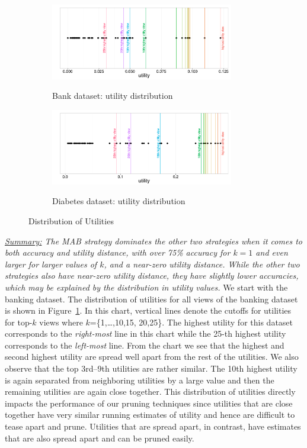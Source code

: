 \begin{figure}[h]
	\centering
	\begin{subfigure}{1\linewidth}
		\centering
		{\includegraphics[width=8cm]
		{Images/bank_utility_distribution.pdf}}
		\caption{Bank dataset: utility distribution}
		\label{fig:bank_utility_distribution}
	\end{subfigure}
	
	\begin{subfigure}{1\linewidth}
		\centering
		{\includegraphics[width=8cm]
		{Images/diabetes_utility_distribution.pdf}}
		\caption{Diabetes dataset: utility distribution}
		\label{fig:diabetes_utility_distribution}
	\end{subfigure}

\vspace{-5pt}
\label{fig:utility_distribution}
\caption{Distribution of Utilities}
\vspace{-10pt}
\end{figure}


{\em \underline{Summary:} The MAB strategy dominates the other two 
strategies when it comes to both accuracy and utility distance,
with over 75\% accuracy for $k = 1$ and even larger for larger
values of $k$, and a near-zero utility distance. 
While the other two strategies also have near-zero utility distance,
they have slightly lower accuracies, which may be explained by the 
distribution in utility values.
 }
We start with the banking dataset.
The distribution of utilities for all views of the banking dataset is
shown in Figure~\ref{fig:bank_utility_distribution}. 
In this chart, vertical lines denote the cutoffs for utilities for top-$k$ views
where $k$=\{1,\ldots,10,15, 20,25\}.
The highest utility for this dataset corresponds to the {\it right-most} line
in this chart while the 25-th highest utility corresponds to the {\it left-most}
line.
From the chart we see that the
highest and second highest utility are spread well apart from the rest of the
utilities.
We also observe that the top 3rd--9th utilities are rather similar. 
The 10th highest utility is again separated from neighboring utilities by a
large value and then the remaining utilities are again close together.
This distribution of utilities directly impacts the performance of our pruning
techniques since utilities that are close together have very similar running
estimates of utility and hence are difficult to tease apart and prune.
Utilities that are spread apart, in contrast, have estimates that are also
spread apart and can be pruned easily.

